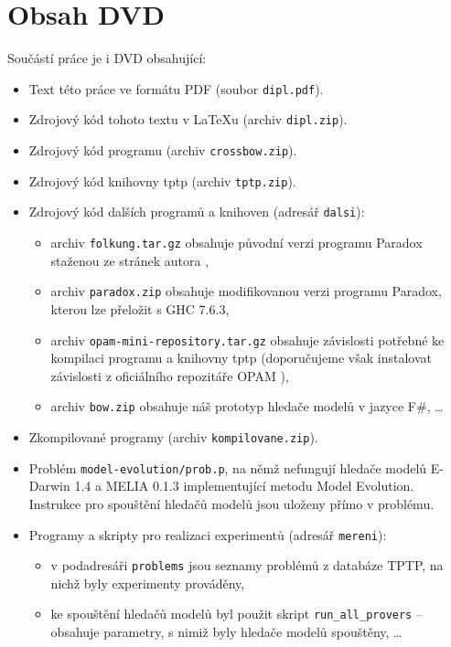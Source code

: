 
\chapter{Obsah DVD}

Součástí práce je i DVD obsahující:
\begin{itemize}
\item Text této práce ve formátu PDF (soubor \texttt{dipl.pdf}).
\item Zdrojový kód tohoto textu v \LaTeX u (archiv \texttt{dipl.zip}).
\item Zdrojový kód programu \crossbow{} (archiv \texttt{crossbow.zip}).
\item Zdrojový kód knihovny tptp (archiv \texttt{tptp.zip}).
\item Zdrojový kód dalších programů a knihoven (adresář \texttt{dalsi}):
  \begin{itemize}
  \item archiv \texttt{folkung.tar.gz} obsahuje původní verzi
    programu Paradox staženou ze stránek autora \cite{paradox},
  \item archiv \texttt{paradox.zip} obsahuje modifikovanou verzi
    programu Paradox, kterou lze přeložit s GHC 7.6.3,
  \item archiv \texttt{opam-mini-repository.tar.gz} obsahuje
    závislosti potřebné ke kompilaci programu \crossbow{} a knihovny tptp
    (doporučujeme však instalovat závislosti z oficiálního
    repozitáře OPAM \cite{opam}),
  \item archiv \texttt{bow.zip} obsahuje
    náš prototyp hledače modelů v jazyce F\#, \dots
  \end{itemize}
\item Zkompilované programy (archiv \texttt{kompilovane.zip}).
\item Problém \texttt{model-evolution/prob.p}, na němž nefungují
  hledače modelů E-Darwin 1.4 a MELIA 0.1.3 implementující metodu
  Model Evolution. Instrukce pro spouštění hledačů modelů jsou uloženy
  přímo v problému.
\item Programy a skripty pro realizaci experimentů (adresář \texttt{mereni}):
  \begin{itemize}
  \item v podadresáři \texttt{problems} jsou seznamy problémů
    z databáze TPTP, na nichž byly experimenty prováděny,
  \item ke spouštění hledačů modelů byl použit skript
    \texttt{run\_all\_provers} -- obsahuje parametry, s nimiž byly
    hledače modelů spouštěny, \dots
  \end{itemize}

\end{itemize}
